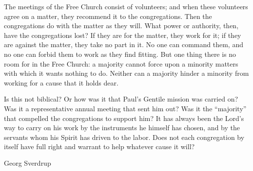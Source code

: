 The meetings of the Free Church consist of volunteers; and when these volunteers agree on a matter, they recommend it to the congregations. Then the congregations do with the matter as they will. What power or authority, then, have the congregations lost? If they are for the matter, they work for it; if they are against the matter, they take no part in it. No one can command them, and no one can forbid them to work as they find fitting. But one thing there is no room for in the Free Church: a majority cannot force upon a minority matters with which it wants nothing to do. Neither can a majority hinder a minority from working for a cause that it holds dear.

Is this not biblical? Or how was it that Paul’s Gentile mission was carried on? Was it a representative annual meeting that sent him out? Was it the “majority” that compelled the congregations to support him? It has always been the Lord’s way to carry on his work by the instruments he himself has chosen, and by the servants whom his Spirit has driven to the labor. Does not each congregation by itself have full right and warrant to help whatever cause it will?

Georg Sverdrup

